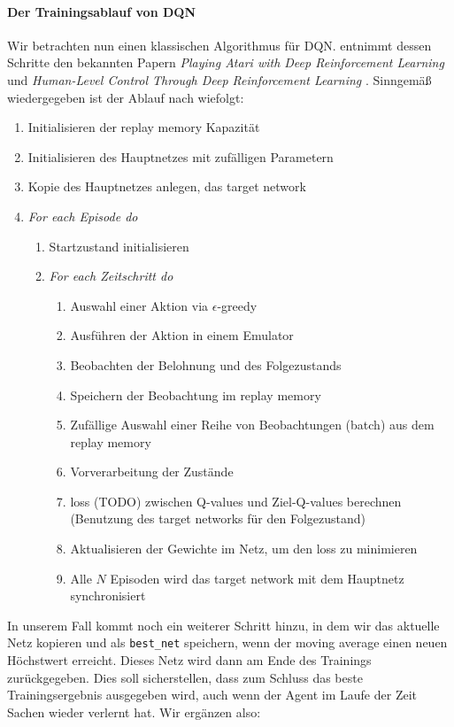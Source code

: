 \paragraph{Der Trainingsablauf von DQN}
Wir betrachten nun einen klassischen Algorithmus für DQN. \cite{11_maxim2018deeprl} entnimmt dessen Schritte den bekannten Papern \textit{Playing Atari with Deep Reinforcement Learning} \cite{13_mnih2013atari} und \textit{Human-Level Control Through Deep Reinforcement Learning} \cite{12_mnih2015humanlevel}. Sinngemäß wiedergegeben ist der Ablauf nach \cite{12_mnih2015humanlevel} wiefolgt:
\begin{enumerate}[nosep]
    \item Initialisieren der replay memory Kapazität
    \item Initialisieren des Hauptnetzes mit zufälligen Parametern
    \item Kopie des Hauptnetzes anlegen, das target network
    \item \textit{For each Episode do}
    \begin{enumerate}
        \item Startzustand initialisieren
        \item \textit{For each Zeitschritt do}
        \begin{enumerate}
            \item Auswahl einer Aktion via $ \epsilon $-greedy
            \item Ausführen der Aktion in einem Emulator
            \item Beobachten der Belohnung und des Folgezustands
            \item Speichern der Beobachtung im replay memory
            \item Zufällige Auswahl einer Reihe von Beobachtungen (batch) aus dem replay memory
            \item Vorverarbeitung der Zustände
            \item loss (TODO) zwischen Q-values und Ziel-Q-values berechnen (Benutzung des target networks für den Folgezustand)
            \item Aktualisieren der Gewichte im Netz, um den loss zu minimieren
            \item Alle $ N $ Episoden wird das target network mit dem Hauptnetz synchronisiert
        \end{enumerate}
    \end{enumerate}
\end{enumerate}
In unserem Fall kommt noch ein weiterer Schritt hinzu, in dem wir das aktuelle Netz kopieren und als \texttt{best_net} speichern, wenn der moving average einen neuen Höchstwert erreicht. Dieses Netz wird dann am Ende des Trainings zurückgegeben. Dies soll sicherstellen, dass zum Schluss das beste Trainingsergebnis ausgegeben wird, auch wenn der Agent im Laufe der Zeit Sachen wieder verlernt hat. Wir ergänzen also:
